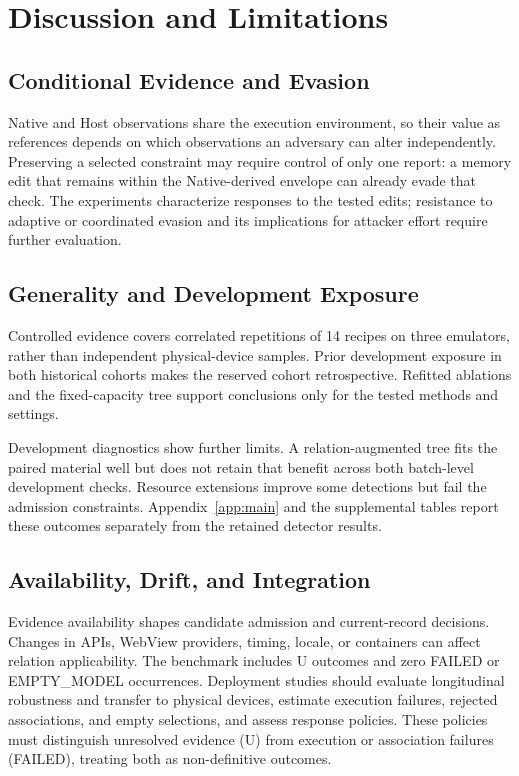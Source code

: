 \hypertarget{sec:6}{%
\section{Discussion and Limitations}\label{sec:6}}

\hypertarget{sec:6-1}{%
\subsection{Conditional Evidence and Evasion}\label{sec:6-1}}

Native and Host observations share the execution environment, so their value as references depends on which observations an adversary can alter independently. Preserving a selected constraint may require control of only one report: a memory edit that remains within the Native-derived envelope can already evade that check. The experiments characterize responses to the tested edits; resistance to adaptive or coordinated evasion and its implications for attacker effort require further evaluation.

\hypertarget{sec:6-2}{%
\subsection{Generality and Development Exposure}\label{sec:6-2}}

Controlled evidence covers correlated repetitions of 14 recipes on three emulators, rather than independent physical-device samples. Prior development exposure in both historical cohorts makes the reserved cohort retrospective. Refitted ablations and the fixed-capacity tree support conclusions only for the tested methods and settings.

Development diagnostics show further limits. A relation-augmented tree fits the paired material well but does not retain that benefit across both batch-level development checks. Resource extensions improve some detections but fail the admission constraints. Appendix~\ref{app:main} and the supplemental tables report these outcomes separately from the retained detector results.

\hypertarget{sec:6-3}{%
\subsection{Availability, Drift, and Integration}\label{sec:6-3}}

Evidence availability shapes candidate admission and current-record decisions. Changes in APIs, WebView providers, timing, locale, or containers can affect relation applicability. The benchmark includes U outcomes and zero FAILED or EMPTY\_\allowbreak{}MODEL occurrences. Deployment studies should evaluate longitudinal robustness and transfer to physical devices, estimate execution failures, rejected associations, and empty selections, and assess response policies. These policies must distinguish unresolved evidence (U) from execution or association failures (FAILED), treating both as non-definitive outcomes.

